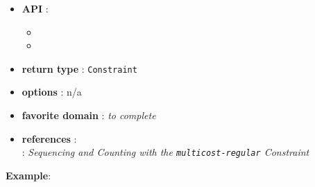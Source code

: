 \begin{itemize}
	\item \textbf{API} : 
      \begin{itemize}
      \item {}
      \item {}
      \end{itemize}
	\item \textbf{return type} : \texttt{Constraint}
	\item \textbf{options} : n/a
	\item \textbf{favorite domain} : \emph{to complete}
	\item \textbf{references} :\\
       \cite{MenanaCPAIOR09}: \emph{Sequencing and Counting with the {\tt multicost-regular} Constraint}
\end{itemize}

\textbf{Example}:



